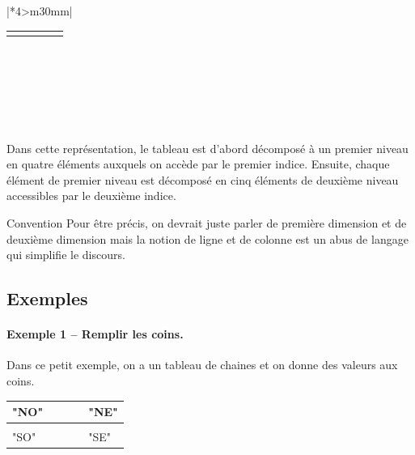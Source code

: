 \begin{center}
\begin{tabular}{|*{4}{>{\centering\arraybackslash}m{30mm}|}}
\begin{minipage}{30mm}
				\begin{tabular}{*{5}{>{\centering\arraybackslash}m{1.5mm}}}
					0 & 1 & 2 & 3 & 4 \\
				\end{tabular}
				\\		
				\begin{tabular}{|*{5}{>{\centering\arraybackslash}m{1.5mm}|}}
					\hline
					30 & 31 & 32 & 33 & 34 \\
					\hline
				\end{tabular}
				\\
			\end{minipage}
			\\
			\hline
		\end{tabular}
		\end{center}

		Dans cette représentation, le tableau \lda{nombres} est
		d’abord décomposé à un premier niveau en quatre éléments auxquels on
		accède par le premier indice. Ensuite, chaque élément de premier niveau
		est décomposé en cinq éléments de deuxième niveau accessibles par le
		deuxième indice.

		\begin{infotbox}{Convention}
			Pour être précis,
			on devrait juste parler de première dimension et
			de deuxième dimension
			mais la notion de ligne et de colonne
			est un abus de langage qui simplifie le discours.
		\end{infotbox}

	\subsection{Exemples}
	
		\paragraph{Exemple 1 -- Remplir les coins.}
		Dans ce petit exemple,
		on a un tableau de chaines et on donne des valeurs aux coins.
		
		\begin{center}
			\begin{tabular}{|*{5}{>{\centering\arraybackslash}m{1cm}|}}
				\hline
				"NO" &
				 &
				 &
				 &
				"NE"
				\\\hline
				 &
				 &
				 &
				 &
				\\\hline
				"SO" &
				 &
				 &
				 &
				"SE"
				\\\hline
			\end{tabular}	
		\end{center}
		
